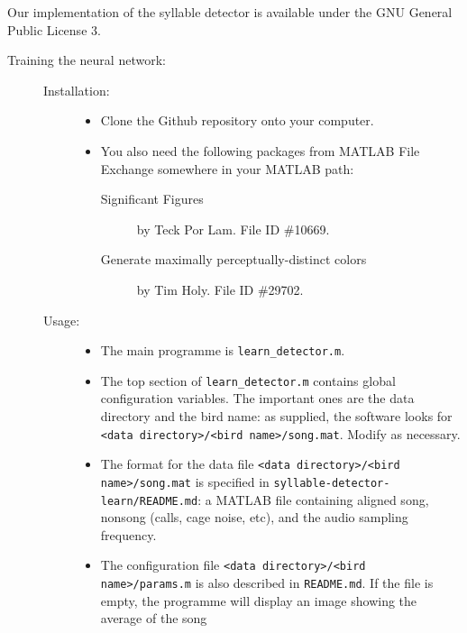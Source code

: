 \documentclass[10pt,letterpaper]{article}
\begin{document}
\noindent Our implementation of the syllable
detector is available under the GNU General Public License 3.
\begin{description}
\item[Training the neural network:]\hfill

  \begin{description}
  \item[Installation:]\hfill
    \begin{itemize}
    \item Clone the Github repository onto your computer.
    \item You also need the following packages from MATLAB File Exchange somewhere in your MATLAB path:
      \begin{description}
      \item[Significant Figures] by Teck Por Lam.  File ID \#10669.
      \item[Generate maximally perceptually-distinct colors] by Tim Holy.  File ID \#29702.
      \end{description}
    \end{itemize}
  \item[Usage:]\hfill
    \begin{itemize}
      \item The main programme is {\tt learn\_detector.m}.
    \item The top section of {\tt learn\_detector.m} contains global
      configuration variables.  The important ones are the data
      directory and the bird name: as supplied, the software looks for
      {\tt \textless data directory\textgreater/\textless bird
        name\textgreater/song.mat}.  Modify as necessary.
    \item The format for the data file {\tt \textless data
      directory\textgreater/\textless bird name\textgreater/song.mat}
      is specified in {\tt syllable-detector-learn/README.md}: a
      MATLAB file containing aligned song, nonsong (calls, cage noise,
      etc), and the audio sampling frequency.
    \item The configuration file {\tt \textless data
      directory\textgreater/\textless bird name\textgreater/params.m}
      is also described in {\tt README.md}.  If the file is empty, the
      programme will display an image showing the average of the song

\end{itemize}
\end{description}
\end{description}
\end{document}
